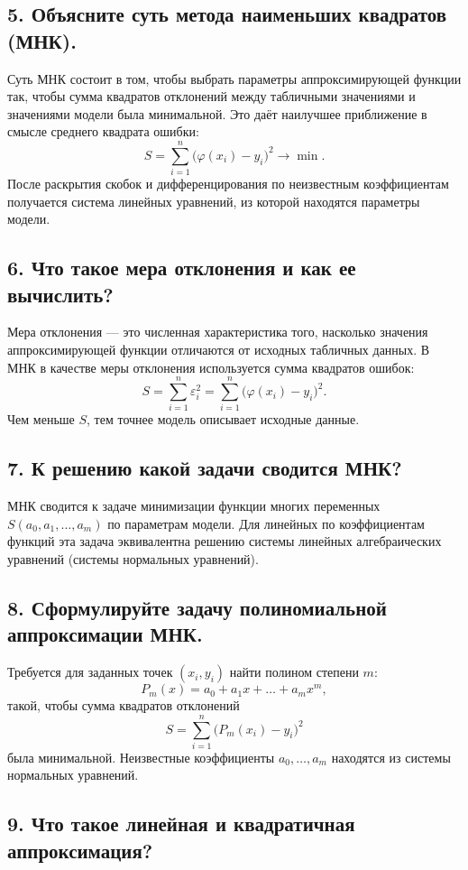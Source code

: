 \documentclass[a4paper,12pt]{article}
\begin{document}
\subsection*{5. Объясните суть метода наименьших квадратов (МНК).}

Суть МНК состоит в том, чтобы выбрать параметры аппроксимирующей функции так, чтобы сумма квадратов отклонений между табличными значениями и значениями модели была минимальной. Это даёт наилучшее приближение в смысле среднего квадрата ошибки:
\[
S = \sum_{i=1}^{n}\bigl(\varphi(x_i)-y_i\bigr)^2 \to \min.
\]
После раскрытия скобок и дифференцирования по неизвестным коэффициентам получается система линейных уравнений, из которой находятся параметры модели.

\subsection*{6. Что такое мера отклонения и как ее вычислить?}

Мера отклонения --- это численная характеристика того, насколько значения аппроксимирующей функции отличаются от исходных табличных данных. В МНК в качестве меры отклонения используется сумма квадратов ошибок:
\[
S = \sum_{i=1}^{n} \varepsilon_i^2 = \sum_{i=1}^{n}\bigl(\varphi(x_i)-y_i\bigr)^2.
\]
Чем меньше $S$, тем точнее модель описывает исходные данные.

\subsection*{7. К решению какой задачи сводится МНК?}

МНК сводится к задаче минимизации функции многих переменных $S(a_0,a_1,\dots,a_m)$ по параметрам модели. Для линейных по коэффициентам функций эта задача эквивалентна решению системы линейных алгебраических уравнений (системы нормальных уравнений).

\subsection*{8. Сформулируйте задачу полиномиальной аппроксимации МНК.}

Требуется для заданных точек $(x_i,y_i)$ найти полином степени $m$:
\[
P_m(x)=a_0+a_1x+\dots+a_mx^m,
\]
такой, чтобы сумма квадратов отклонений
\[
S=\sum_{i=1}^{n}\bigl(P_m(x_i)-y_i\bigr)^2
\]
была минимальной. Неизвестные коэффициенты $a_0,\dots,a_m$ находятся из системы нормальных уравнений.

\subsection*{9. Что такое линейная и квадратичная аппроксимация?}
\end{document}
